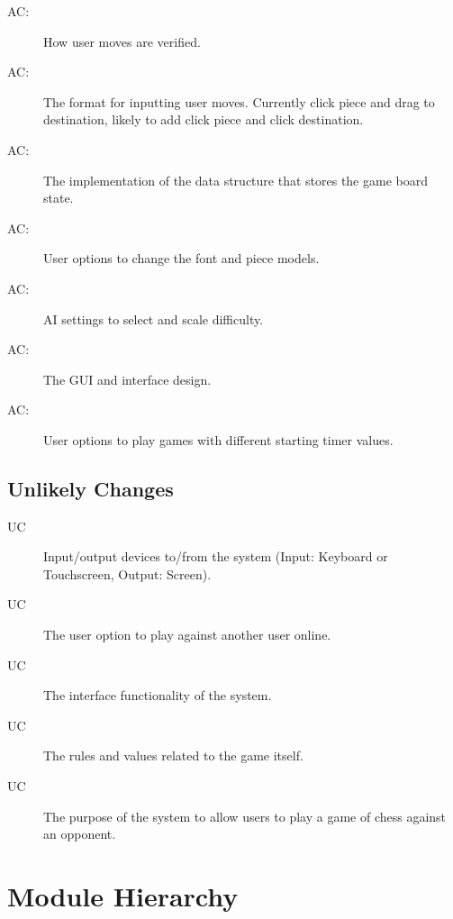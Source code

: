 \documentclass[12pt, titlepage]{article}
\newcounter{acnum}
\newcommand{\actheacnum}{AC\theacnum}
\newcounter{ucnum}
\newcommand{\uctheucnum}{UC\theucnum}
\begin{document}
\begin{description}
\item[ \actheacnum \label{acVerification}:] How user moves are verified.
\item[ \actheacnum \label{acInput}:] The format for inputting user moves. Currently click piece and drag to destination, likely to add click piece and click destination.
\item[ \actheacnum \label{acBoardState}:] The implementation of the data structure that stores the game board state.
\item[ \actheacnum \label{acFontAndPieces}:] User options to change the font and piece models.
\item[ \actheacnum \label{acAI}:] AI settings to select and scale difficulty.
\item[ \actheacnum \label{acGUI}:] The GUI and interface design.
\item[ \actheacnum \label{acTimers}:] User options to play games with different starting timer values.
\end{description}

\subsection{Unlikely Changes} \label{SecUchange}

\begin{description}
\item[ \uctheucnum] Input/output devices to/from the system (Input: Keyboard or Touchscreen, Output: Screen).
\item[ \uctheucnum] The user option to play against another user online.
\item[ \uctheucnum] The interface functionality of the system.
\item[ \uctheucnum] The rules and values related to the game itself.
\item[ \uctheucnum] The purpose of the system to allow users to play a game of chess against an opponent.
\end{description}

\section{Module Hierarchy} \label{SecMH}
\end{document}
